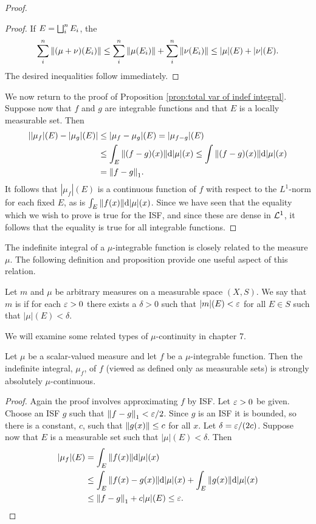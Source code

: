 \begin{proof}
\begin{proof}
If $E=\bigsqcup_i^nE_i$, the $$\sum_i^n\norm{(\mu+\nu)(E_i)}\leq\sum_i^n\norm{\mu(E_i)}+\sum_i^n\norm{\nu(E_i)}\leq|\mu|(E)+|\nu|(E).$$ The desired inequalities follow immediately.
\end{proof}

We now return to the proof of Proposition \ref{prop:total var of indef integral}. Suppose now that $f$ and $g$ are integrable functions and that $E$ is a locally measurable set. Then
\begin{align*}
    ||\mu_f|(E)-|\mu_g|(E)|&\leq|\mu_f-\mu_g|(E)=|\mu_{f-g}|(E)\\
    &\leq\int_E\norm{(f-g)(x)}\dd|\mu|(x)\leq\int\norm{(f-g)(x)}\dd|\mu|(x)\\
    &=\norm{f-g}_1.
\end{align*}
It follows that $|\mu_f|(E)$ is a continuous function of $f$ with respect to the $L^1$-norm for each fixed $E$, as is $\int_E\norm{f(x)}\dd|\mu|(x)$. Since we have seen that the equality which we wish to prove is true for the ISF, and since these are dense in ${\cal L}^1$, it follows that the equality is true for all integrable functions.

\end{proof}

The indefinite integral of a $\mu$-integrable function is closely related to the measure $\mu$. The following definition and proposition provide one useful aspect of this relation.

\begin{definition}
Let $m$ and $\mu$ be arbitrary measures on a measurable space $(X,S)$. We say that $m$ is  if for each $\varepsilon>0$ there exists a $\delta>0$ such that $|m|(E)<\varepsilon$ for all $E\in S$ such that $|\mu|(E)<\delta$.
\end{definition}

We will examine some related types of $\mu$-continuity in chapter 7. %

\begin{proposition}\label{prop:indef int mu strong abs cts}
Let $\mu$ be a scalar-valued measure and let $f$ be a $\mu$-integrable function. Then the indefinite integral, $\mu_f$, of $f$ (viewed as defined only as measurable sets) is strongly absolutely $\mu$-continuous.
\end{proposition}

\begin{proof}
Again the proof involves approximating $f$ by ISF. Let $\varepsilon>0$ be given. Choose an ISF $g$ such that $\norm{f-g}_1<\varepsilon/2$. Since $g$ is an ISF it is bounded, so there is a constant, $c$, such that $\norm{g(x)}\leq c$ for all $x$. Let $\delta=\varepsilon/(2c)$. Suppose now that $E$ is a measurable set such that $|\mu|(E)<\delta$. Then
\begin{align*}
    |\mu_f|(E)&=\int_E\norm{f(x)}\dd|\mu|(x)\\
    &\leq\int_E\norm{f(x)-g(x)}\dd|\mu|(x)+\int_E\norm{g(x)}\dd|\mu|(x)\\
    &\leq\norm{f-g}_1+c|\mu|(E)\leq\varepsilon.
\end{align*}
\end{proof}

